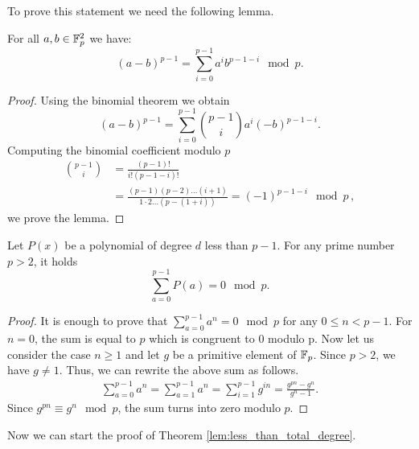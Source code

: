   To prove this statement we need the following lemma.

  \begin{lemma}\label{lem:difference_to_p-1}
    For all $a,b\in\mathbb{F}_p^2$ we have:
    \[
      (a - b)^{p-1} = \sum_{i=0}^{p-1} a^i b^{p-1-i} \mod p.
    \]
  \end{lemma}
  \begin{proof}
    Using the binomial theorem we obtain
    \[
      (a - b)^{p-1} = \sum_{i=0}^{p-1} \binom{p-1}{i} a^i (-b)^{p-1-i}.
    \]
    Computing the binomial coefficient modulo $p$
    \begin{align*}
      \binom{p-1}{i} & = \frac{(p-1)!}{i! (p-1-i)!} \\
      & = \frac{(p-1)(p-2)\dots(i+1)}{1 \cdot 2 \dots (p-(1+i))} = (-1)^{p-1-i} \mod p\,,
    \end{align*}
    we prove the lemma.
  \end{proof}

  \begin{lemma}\label{lem:sum_poly}
    Let $P(x)$ be a polynomial of degree $d$ less than $p-1$.
    For any prime number $p > 2$, it holds
    \[
      \sum_{a=0}^{p-1} P(a) = 0 \mod p.
    \]
  \end{lemma}
  \begin{proof}
    It is enough to prove that $\sum_{a=0}^{p-1} a^n = 0 \mod p$ for any $0 \leq n < p-1$. For $n = 0$, the sum is equal to $p$ which is congruent to $0$ modulo p. Now let us consider the case $n\geq 1$ and let $g$ be a primitive element of $\mathbb{F}_p$.
    Since $p > 2$, we have $g \ne 1$.
    Thus, we can rewrite the above sum as follows.
    \begin{align*}
      \sum_{a=0}^{p-1} a^{n} = \sum_{a=1}^{p-1} a^{n} = \sum_{i=1}^{p-1} g^{in} = \frac{g^{pn} - g^n}{g^n - 1}.
    \end{align*}
    Since $g^{pn} \equiv g^n \mod p$, the sum turns into zero modulo $p$.
  \end{proof}

  Now we can start the proof of Theorem \ref{lem:less_than_total_degree}.
  
